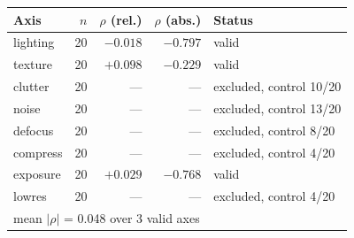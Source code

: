 \begin{tabular}{lrrrl}
\toprule
Axis & $n$ & $\rho$ (rel.) & $\rho$ (abs.) & Status \\
\midrule
lighting & 20 & $-0.018$ & $-0.797$ & valid \\
texture & 20 & $+0.098$ & $-0.229$ & valid \\
clutter & 20 & --- & --- & excluded, control 10/20 \\
noise & 20 & --- & --- & excluded, control 13/20 \\
defocus & 20 & --- & --- & excluded, control 8/20 \\
compress & 20 & --- & --- & excluded, control 4/20 \\
exposure & 20 & $+0.029$ & $-0.768$ & valid \\
lowres & 20 & --- & --- & excluded, control 4/20 \\
\midrule
\multicolumn{5}{l}{mean $|\rho|$ = 0.048 over 3 valid axes} \\
\bottomrule
\end{tabular}
